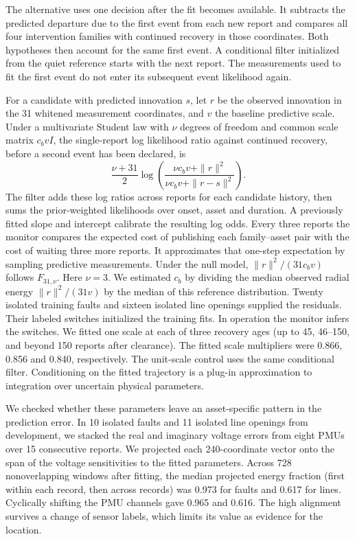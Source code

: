 The alternative uses one decision after the fit becomes available.
It subtracts the predicted departure due to the first event from each
new report and compares all four intervention families with continued
recovery in those coordinates. Both hypotheses then account for the
same first event. A conditional filter initialized from the quiet
reference starts with the next report. The measurements used to fit the
first event do not enter its subsequent event likelihood again.

For a candidate with predicted innovation $s$, let $r$ be the observed
innovation in the 31 whitened measurement coordinates, and $v$ the
baseline predictive scale. Under a multivariate Student law with
$\nu$ degrees of freedom and common scale matrix $c_b v I$, the
single-report log likelihood ratio against continued recovery, before a
second event has been declared, is
\[
 \frac{\nu+31}{2}
 \log\!\left(\frac{\nu c_b v+\|r\|^2}
                   {\nu c_b v+\|r-s\|^2}\right).
\]
The filter adds these log ratios across reports for each candidate history,
then sums the prior-weighted likelihoods over onset, asset and duration.
A previously fitted slope and intercept calibrate the resulting log odds.
Every three reports the monitor compares the expected cost of publishing
each family--asset pair with the cost of waiting three more reports. It
approximates that one-step expectation by sampling predictive measurements.
Under the null model, $\|r\|^2/(31c_b v)$ follows $F_{31,\nu}$.
Here $\nu=3$. We estimated $c_b$ by dividing the median observed radial energy
$\|r\|^2/(31v)$ by the median of this reference distribution.
Twenty isolated training faults and sixteen isolated line openings supplied the residuals.
Their labeled switches initialized the training fits. In operation the
monitor infers the switches. We fitted one scale at each of three
recovery ages (up to 45, 46--150, and beyond 150 reports after
clearance). The fitted scale multipliers were 0.866, 0.856 and 0.840,
respectively. The unit-scale control uses the same conditional filter.
Conditioning on the fitted trajectory is a plug-in approximation to
integration over uncertain physical parameters.

We checked whether these parameters leave an asset-specific pattern in
the prediction error. In 10 isolated faults and 11 isolated line openings
from development, we stacked the real and imaginary voltage errors from
eight PMUs over 15 consecutive reports. We projected each 240-coordinate
vector onto the span of the voltage sensitivities to the fitted parameters.
Across 728 nonoverlapping windows after fitting, the median projected
energy fraction (first within each record, then across records) was
0.973 for faults and 0.617 for lines. Cyclically shifting the PMU
channels gave 0.965 and 0.616. The high alignment survives a change of
sensor labels, which limits its value as evidence for the location.

